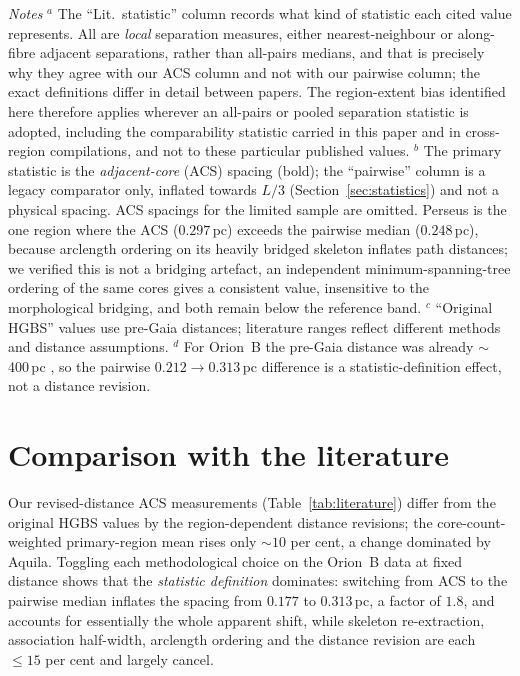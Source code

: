 \documentclass[usenatbib,twoside,twocolumn]{mnras}
\begin{document}
\begin{table}
\vspace{0.1in}
\footnotesize
\emph{Notes} $^{a}$ The ``Lit.\ statistic'' column records what kind of statistic each cited value represents. All are \emph{local} separation measures, either nearest-neighbour or along-fibre adjacent separations, rather than all-pairs medians, and that is precisely why they agree with our ACS column and not with our pairwise column; the exact definitions differ in detail between papers. The region-extent bias identified here therefore applies wherever an all-pairs or pooled separation statistic is adopted, including the comparability statistic carried in this paper and in cross-region compilations, and not to these particular published values. $^{b}$ The primary statistic is the \emph{adjacent-core} (ACS) spacing (bold); the ``pairwise'' column is a legacy comparator only, inflated towards $L/3$ (Section~\ref{sec:statistics}) and not a physical spacing. ACS spacings for the limited sample are omitted. Perseus is the one region where the ACS ($0.297$\,pc) exceeds the pairwise median ($0.248$\,pc), because arclength ordering on its heavily bridged skeleton inflates path distances; we verified this is not a bridging artefact, an independent minimum-spanning-tree ordering of the same cores gives a consistent value, insensitive to the morphological bridging, and both remain below the reference band. $^{c}$ ``Original HGBS'' values use pre-Gaia distances; literature ranges reflect different methods and distance assumptions. $^{d}$ For Orion~B the pre-Gaia distance was already $\sim$400\,pc \citep{Konyves2020}, so the pairwise $0.212\to0.313$\,pc difference is a statistic-definition effect, not a distance revision.
\end{table}

\section{Comparison with the literature}
\label{sec:lit}

Our revised-distance ACS measurements (Table~\ref{tab:literature}) differ from the original HGBS values by the region-dependent distance revisions; the core-count-weighted primary-region mean rises only $\sim10$ per cent, a change dominated by Aquila. Toggling each methodological choice on the Orion~B data at fixed distance shows that the \emph{statistic definition} dominates: switching from ACS to the pairwise median inflates the spacing from $0.177$ to $0.313$\,pc, a factor of $1.8$, and accounts for essentially the whole apparent shift, while skeleton re-extraction, association half-width, arclength ordering and the distance revision are each $\leq15$ per cent and largely cancel.
\end{document}
